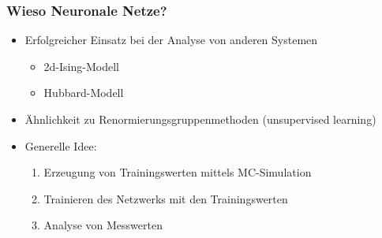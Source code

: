 \begin{frame}
\frametitle{Wieso Neuronale Netze?}
  \begin{itemize}
    \item Erfolgreicher Einsatz bei der Analyse von anderen Systemen\\
          \begin{itemize}
              \item 2d-Ising-Modell
              \item Hubbard-Modell
          \end{itemize}
    \item Ähnlichkeit zu Renormierungsgruppenmethoden (unsupervised learning)
    \item Generelle Idee:\\
        \begin{enumerate}
          \item Erzeugung von Trainingswerten mittels MC-Simulation
          \item Trainieren des Netzwerks mit den Trainingswerten
          \item Analyse von Messwerten
        \end{enumerate}
  \end{itemize}
\end{frame}
